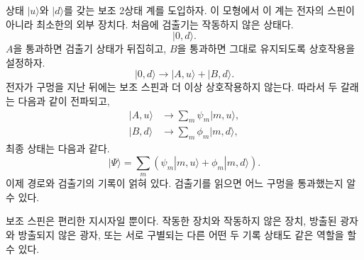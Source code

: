 상태 \(|u\rangle\)와 \(|d\rangle\)를 갖는 보조 2상태 계를 도입하자. 이 모형에서 이 계는 전자의 스핀이 아니라 최소한의 외부 장치다. 처음에 검출기는 작동하지 않은 상태다.
\begin{equation}
|0,d\rangle.
\end{equation}
\(A\)을 통과하면 검출기 상태가 뒤집히고, \(B\)을 통과하면 그대로 유지되도록 상호작용을 설정하자.
\begin{equation}
|0,d\rangle
\longrightarrow
|A,u\rangle+|B,d\rangle.
\end{equation}
전자가 구멍을 지난 뒤에는 보조 스핀과 더 이상 상호작용하지 않는다. 따라서 두 갈래는 다음과 같이 전파되고,
\begin{align}
|A,u\rangle &\longrightarrow \sum_m\psi_m|m,u\rangle, \\
|B,d\rangle &\longrightarrow \sum_m\phi_m|m,d\rangle,
\end{align}
최종 상태는 다음과 같다.
\begin{equation}
|\Psi\rangle
=\sum_m\left(\psi_m|m,u\rangle+\phi_m|m,d\rangle\right).
\end{equation}
이제 경로와 검출기의 기록이 얽혀 있다. 검출기를 읽으면 어느 구멍을 통과했는지 알 수 있다.

\begin{classroomqa}
\end{classroomqa}

보조 스핀은 편리한 지시자일 뿐이다. 작동한 장치와 작동하지 않은 장치, 방출된 광자와 방출되지 않은 광자, 또는 서로 구별되는 다른 어떤 두 기록 상태도 같은 역할을 할 수 있다.

\begin{classroomqa}
\end{classroomqa}

